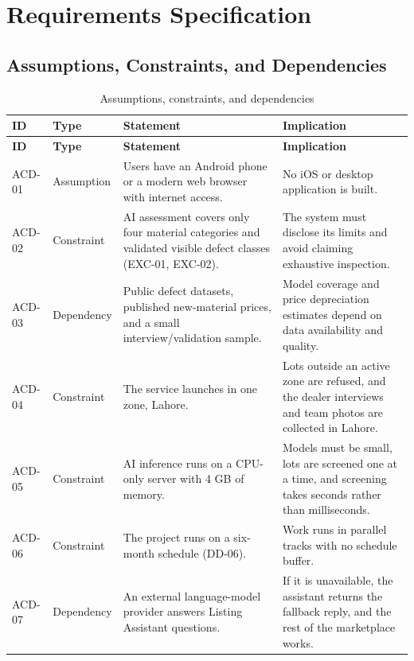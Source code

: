 
\chapter{Requirements Specification}
\label{chap:requirements}

\section{Assumptions, Constraints, and Dependencies}
{\footnotesize
\begin{longtable}{@{}p{}p{}p{}p{}@{}}
\caption{Assumptions, constraints, and dependencies}\label{tab:acd}\\
\toprule
\textbf{ID} & \textbf{Type} & \textbf{Statement} & \textbf{Implication} \\
\midrule
\endfirsthead
\toprule
\textbf{ID} & \textbf{Type} & \textbf{Statement} & \textbf{Implication} \\
\midrule
\endhead
ACD-01 & Assumption & Users have an Android phone or a modern web browser with internet access. & No iOS or desktop application is built. \\
ACD-02 & Constraint & AI assessment covers only four material categories and validated visible defect classes (EXC-01, EXC-02). & The system must disclose its limits and avoid claiming exhaustive inspection. \\
ACD-03 & Dependency & Public defect datasets, published new-material prices, and a small interview/validation sample. & Model coverage and price depreciation estimates depend on data availability and quality. \\
ACD-04 & Constraint & The service launches in one zone, Lahore. & Lots outside an active zone are refused, and the dealer interviews and team photos are collected in Lahore. \\
ACD-05 & Constraint & AI inference runs on a CPU-only server with 4 GB of memory. & Models must be small, lots are screened one at a time, and screening takes seconds rather than milliseconds. \\
ACD-06 & Constraint & The project runs on a six-month schedule (DD-06). & Work runs in parallel tracks with no schedule buffer. \\
ACD-07 & Dependency & An external language-model provider answers Listing Assistant questions. & If it is unavailable, the assistant returns the fallback reply, and the rest of the marketplace works. \\

\end{longtable}}

